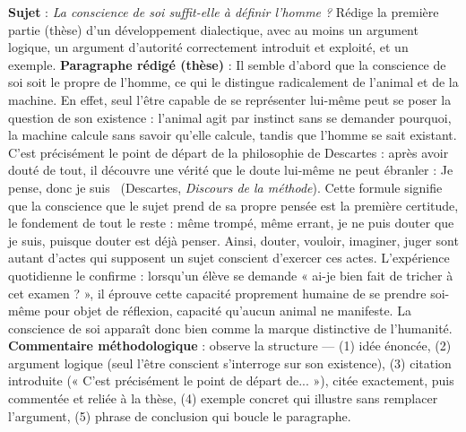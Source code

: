 \documentclass[11pt]{article}
\begin{document}
\begin{exoresolu}
\textbf{Sujet} : \emph{La conscience de soi suffit-elle à définir l'homme ?} Rédige la première partie (thèse) d'un développement dialectique, avec au moins un argument logique, un argument d'autorité correctement introduit et exploité, et un exemple.
\tcblower
\textbf{Paragraphe rédigé (thèse)} : Il semble d'abord que la conscience de soi soit le propre de l'homme, ce qui le distingue radicalement de l'animal et de la machine. En effet, seul l'être capable de se représenter lui-même peut se poser la question de son existence : l'animal agit par instinct sans se demander pourquoi, la machine calcule sans savoir qu'elle calcule, tandis que l'homme se sait existant. C'est précisément le point de départ de la philosophie de Descartes : après avoir douté de tout, il découvre une vérité que le doute lui-même ne peut ébranler : \guillemotleft Je pense, donc je suis \guillemotright\ (Descartes, \emph{Discours de la méthode}). Cette formule signifie que la conscience que le sujet prend de sa propre pensée est la première certitude, le fondement de tout le reste : même trompé, même errant, je ne puis douter que je suis, puisque douter est déjà penser. Ainsi, douter, vouloir, imaginer, juger sont autant d'actes qui supposent un sujet conscient d'exercer ces actes. L'expérience quotidienne le confirme : lorsqu'un élève se demande « ai-je bien fait de tricher à cet examen ? », il éprouve cette capacité proprement humaine de se prendre soi-même pour objet de réflexion, capacité qu'aucun animal ne manifeste. La conscience de soi apparaît donc bien comme la marque distinctive de l'humanité. \textbf{Commentaire méthodologique} : observe la structure — (1) idée énoncée, (2) argument logique (seul l'être conscient s'interroge sur son existence), (3) citation introduite (« C'est précisément le point de départ de... »), citée exactement, puis commentée et reliée à la thèse, (4) exemple concret qui illustre sans remplacer l'argument, (5) phrase de conclusion qui boucle le paragraphe.
\end{exoresolu}
\end{document}
